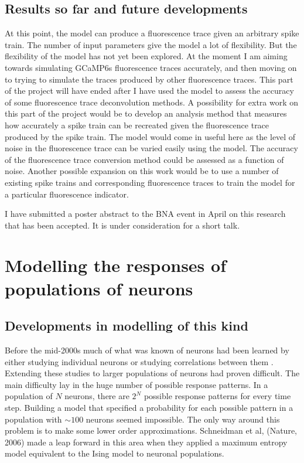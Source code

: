 \documentclass[a4paper,12pt]{article}
\theoremstyle{definition}
\begin{document}
\subsection{Results so far and future developments}
	At this point, the model can produce a fluorescence trace given an arbitrary spike train. The number of input parameters give the model a lot of flexibility. But the flexibility of the model has not yet been explored. At the moment I am aiming towards simulating GCaMP6s fluorescence traces accurately, and then moving on to trying to simulate the traces produced by other fluorescence traces. This part of the project will have ended after I have used the model to assess the accuracy of some fluorescence trace deconvolution methods. A possibility for extra work on this part of the project would be to develop an analysis method that measures how accurately a spike train can be recreated given the fluorescence trace produced by the spike train. The model would come in useful here as the level of noise in the fluorescence trace can be varied easily using the model. The accuracy of the fluorescence trace conversion method could be assessed as a function of noise. Another possible expansion on this work would be to use a number of existing spike trains and corresponding fluorescence traces to train the model for a particular fluorescence indicator.
	
	I have submitted a poster abstract to the BNA event in April on this research that has been accepted. It is under consideration for a short talk.

\section{Modelling the responses of populations of neurons}

\subsection{Developments in modelling of this kind}
	Before the mid-2000s much of what was known of neurons had been learned by either studying individual neurons or studying correlations between them \cite{zohary}. Extending these studies to larger populations of neurons had proven difficult. The main difficulty lay in the huge number of possible response patterns. In a population of $N$ neurons, there are $2^N$ possible response patterns for every time step. Building a model that specified a probability for each possible pattern in a population with $\sim 100$ neurons seemed impossible. The only way around this problem is to make some lower order approximations. Schneidman et al, (Nature, 2006) made a leap forward in this area when they applied a maximum entropy model equivalent to the Ising model to neuronal populations.
	
\end{document}
